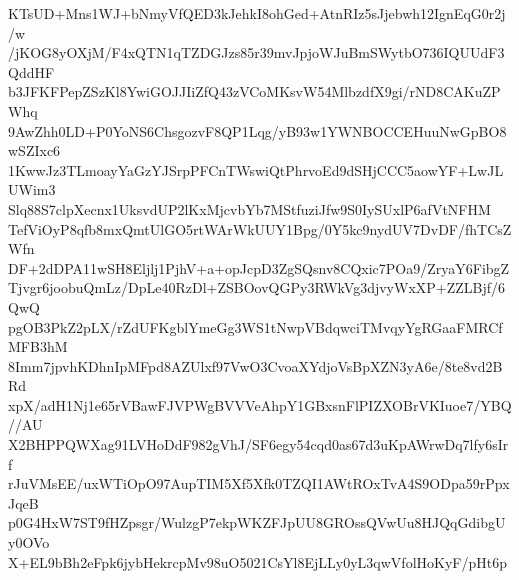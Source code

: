 KTsUD+Mns1WJ+bNmyVfQED3kJehkI8ohGed+AtnRIz5sJjebwh12IgnEqG0r2j/w
/jKOG8yOXjM/F4xQTN1qTZDGJzs85r39mvJpjoWJuBmSWytbO736IQUUdF3QddHF
b3JFKFPepZSzKl8YwiGOJJIiZfQ43zVCoMKsvW54MlbzdfX9gi/rND8CAKuZPWhq
9AwZhh0LD+P0YoNS6ChsgozvF8QP1Lqg/yB93w1YWNBOCCEHuuNwGpBO8wSZIxc6
1KwwJz3TLmoayYaGzYJSrpPFCnTWswiQtPhrvoEd9dSHjCCC5aowYF+LwJLUWim3
Slq88S7clpXecnx1UksvdUP2lKxMjcvbYb7MStfuziJfw9S0IySUxlP6afVtNFHM
TefViOyP8qfb8mxQmtUlGO5rtWArWkUUY1Bpg/0Y5kc9nydUV7DvDF/fhTCsZWfn
DF+2dDPA11wSH8Eljlj1PjhV+a+opJcpD3ZgSQsnv8CQxic7POa9/ZryaY6FibgZ
Tjvgr6joobuQmLz/DpLe40RzDl+ZSBOovQGPy3RWkVg3djvyWxXP+ZZLBjf/6QwQ
pgOB3PkZ2pLX/rZdUFKgblYmeGg3WS1tNwpVBdqwciTMvqyYgRGaaFMRCfMFB3hM
8Imm7jpvhKDhnIpMFpd8AZUlxf97VwO3CvoaXYdjoVsBpXZN3yA6e/8te8vd2BRd
xpX/adH1Nj1e65rVBawFJVPWgBVVVeAhpY1GBxsnFlPIZXOBrVKIuoe7/YBQ//AU
X2BHPPQWXag91LVHoDdF982gVhJ/SF6egy54cqd0as67d3uKpAWrwDq7lfy6sIrf
rJuVMsEE/uxWTiOpO97AupTIM5Xf5Xfk0TZQI1AWtROxTvA4S9ODpa59rPpxJqeB
p0G4HxW7ST9fHZpsgr/WulzgP7ekpWKZFJpUU8GROssQVwUu8HJQqGdibgUy0OVo
X+EL9bBh2eFpk6jybHekrcpMv98uO5021CsYl8EjLLy0yL3qwVfolHoKyF/pHt6p
